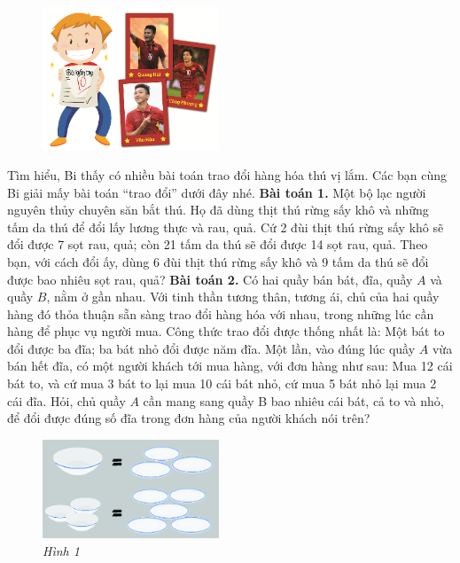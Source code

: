 	\begin{figure}[H]
		\centering
		\vspace*{-5pt}
		\captionsetup{labelformat= empty, justification=centering}
		\includegraphics[width=0.47\textwidth]{pic3}
		\vspace*{-5pt}
	\end{figure}
	Tìm hiểu, Bi thấy có nhiều bài toán trao đổi hàng hóa thú vị lắm. Các bạn cùng Bi giải mấy bài toán “trao đổi” dưới đây nhé.
	\vskip 0.15cm
	\textbf{Bài toán 1.} Một bộ lạc người nguyên thủy chuyên săn bắt thú. Họ đã dùng thịt thú rừng sấy khô và những tấm da thú để đổi lấy lương thực và rau, quả. Cứ 2 đùi thịt thú rừng sấy khô sẽ đổi được 7 sọt rau, quả; còn 21 tấm da thú sẽ đổi được 14 sọt rau, quả. Theo bạn, với cách đổi ấy, dùng 6 đùi thịt thú rừng sấy khô và 9 tấm da thú sẽ đổi được bao nhiêu sọt rau, quả?
	\vskip 0.15cm
	\textbf{Bài toán 2.} Có hai quầy bán bát, đĩa, quầy $A$ và quầy $B$, nằm ở gần nhau. Với tinh thần tương thân, tương ái, chủ của hai quầy hàng đó thỏa thuận sẵn sàng trao đổi hàng hóa với nhau, trong những lúc cần hàng để phục vụ người mua. Công thức trao đổi được thống nhất là: Một bát to đổi được ba đĩa; ba bát nhỏ đổi được năm đĩa.
	\vskip 0.15cm
	Một lần, vào đúng lúc quầy $A$ vừa bán hết đĩa, có một người khách tới mua hàng, với đơn hàng như sau: Mua 12 cái bát to, và cứ mua 3 bát to lại mua 10 cái bát nhỏ, cứ mua 5 bát nhỏ lại mua 2 cái đĩa.
	\vskip 0.15cm
	Hỏi, chủ quầy $A$ cần mang sang quầy B bao nhiêu cái bát, cả to và nhỏ, để đổi được đúng số đĩa trong đơn hàng của người khách nói trên?
	\begin{figure}[H]
		\centering
		\vspace*{-5pt}
		\captionsetup{labelformat= empty, justification=centering}
		\includegraphics[width=0.47\textwidth]{pic4}
		\caption{\small\textit{Hình 1}}
		\vspace*{-5pt}
	\end{figure}
